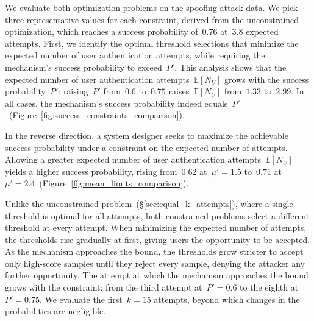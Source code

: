\documentclass[conference,compsoc]{IEEEtran}
\begin{document}
We evaluate both optimization problems on the spoofing attack data. We pick three representative values for each constraint, derived from the unconstrained optimization, which reaches a success probability of~$0.76$ at~$3.8$ expected attempts. First, we identify the optimal threshold selections that minimize the expected number of user authentication attempts, while requiring the mechanism's success probability to exceed~$P'$. This analysis shows that the expected number of user authentication attempts~$\mathbb{E}[N_U]$ grows with the success probability~$P'$: raising~$P'$ from~$0.6$ to~$0.75$ raises~$\mathbb{E}[N_U]$ from~$1.33$ to~$2.99$. In all cases, the mechanism's success probability indeed equals~$P'$~(Figure~\ref{fig:success_constraints_comparison}).

In the reverse direction, a system designer seeks to maximize the achievable success probability under a constraint on the expected number of attempts. Allowing a greater expected number of user authentication attempts~$\mathbb{E}[N_U]$ yields a higher success probability, rising from~$0.62$ at~$\mu'=1.5$ to~$0.71$ at~$\mu'=2.4$~(Figure~\ref{fig:mean_limits_comparison}).

Unlike the unconstrained problem~(\S\ref{sec:equal_k_attempts}), where a single threshold is optimal for all attempts, both constrained problems select a different threshold at every attempt. When minimizing the expected number of attempts, the thresholds rise gradually at first, giving users the opportunity to be accepted. As the mechanism approaches the bound, the thresholds grow stricter to accept only high-score samples until they reject every sample, denying the attacker any further opportunity. The attempt at which the mechanism approaches the bound grows with the constraint: from the third attempt at~$P'=0.6$ to the eighth at~$P'=0.75$. We evaluate the first~$k=15$ attempts, beyond which changes in the probabilities are negligible.

\pgfplotsset{compat=1.18}

\end{document}

